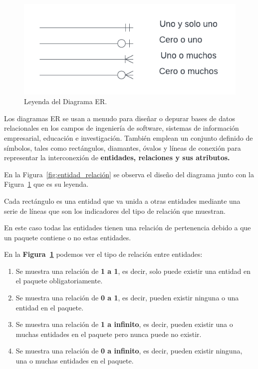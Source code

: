 \documentclass[a4paper, 12pt]{book}
\begin{document}
\begin{figure}
	\centering
	\includegraphics[width=17cm, keepaspectratio]{img/leyenda_diagrama.png}
	\caption{Leyenda del Diagrama ER.}
	\label{fig:leyenda_diagrama}
\end{figure}

Los diagramas ER se usan a menudo para diseñar o depurar bases de datos relacionales en los campos de ingeniería de software, sistemas de información empresarial, educación e investigación. También emplean un conjunto definido de símbolos, tales como rectángulos, diamantes, óvalos y líneas de conexión para representar la interconexión de \textbf {entidades, relaciones y sus atributos.}

En la Figura~\ref{fig:entidad_relación} se observa el diseño del diagrama junto con la Figura~\ref{fig:leyenda_diagrama} que es su leyenda.

Cada rectángulo es una entidad que va unida a otras entidades mediante una serie de líneas que son los indicadores del tipo de relación que muestran.

En este caso todas las entidades tienen una relación de pertenencia debido a que un paquete contiene o no estas entidades.

En la \textbf {Figura~\ref{fig:leyenda_diagrama}} podemos ver el tipo de relación entre entidades:

\begin{enumerate}
\item Se muestra una relación de \textbf {1 a 1}, es decir, solo puede existir una entidad en el paquete obligatoriamente.

\item Se muestra una relación de \textbf {0 a 1}, es decir, pueden existir ninguna o una entidad en el paquete.

\item Se muestra una relación de \textbf {1 a infinito}, es decir, pueden existir una o muchas entidades en el paquete pero nunca puede no existir.

\item Se muestra una relación de \textbf {0 a infinito}, es decir, pueden existir ninguna, una o muchas entidades en el paquete.
\end{enumerate}
\end{document}
